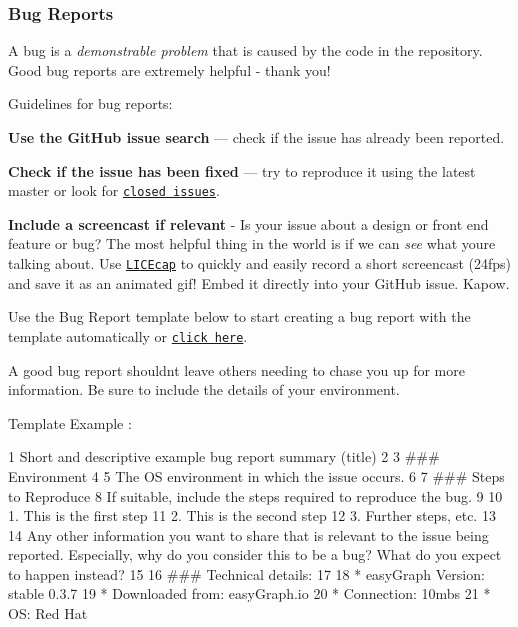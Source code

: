\subsubsection*{Bug Reports}

A bug is a {\itshape demonstrable problem} that is caused by the code in the repository. Good bug reports are extremely helpful -\/ thank you!

Guidelines for bug reports\+:


\begin{DoxyEnumerate}
\item {\bfseries Use the Git\+Hub issue search} --- check if the issue has already been reported.
\item {\bfseries Check if the issue has been fixed} --- try to reproduce it using the latest {\ttfamily master} or look for \href{https://github.com/JairFrancesco/easyGraph/issues?utf8=%E2%9C%93&q=is%3Aissue+is%3Aclosed}{\tt closed issues}.
\item {\bfseries Include a screencast if relevant} -\/ Is your issue about a design or front end feature or bug? The most helpful thing in the world is if we can {\itshape see} what you\textquotesingle{}re talking about. Use \href{http://www.cockos.com/licecap/}{\tt L\+I\+C\+Ecap} to quickly and easily record a short screencast (24fps) and save it as an animated gif! Embed it directly into your Git\+Hub issue. Kapow.
\end{DoxyEnumerate}
\begin{DoxyEnumerate}
\item Use the Bug Report template below to start creating a bug report with the template automatically or \href{http://bit.ly/1MhADoe}{\tt click here}.
\end{DoxyEnumerate}

A good bug report shouldn\textquotesingle{}t leave others needing to chase you up for more information. Be sure to include the details of your environment.

Template Example \+: 
\begin{DoxyCode}
1 Short and descriptive example bug report summary (title)
2 
3 ### Environment
4 
5 The OS environment in which the issue occurs. 
6 
7 ### Steps to Reproduce
8 If suitable, include the steps required to reproduce the bug.
9 
10 1. This is the first step
11 2. This is the second step
12 3. Further steps, etc.
13 
14 Any other information you want to share that is relevant to the issue being reported. Especially, why do
       you consider this to be a bug? What do you expect to happen instead?
15 
16 ### Technical details:
17 
18 * easyGraph Version: stable 0.3.7
19 * Downloaded from: easyGraph.io
20 * Connection: 10mbs
21 * OS: Red Hat
\end{DoxyCode}


